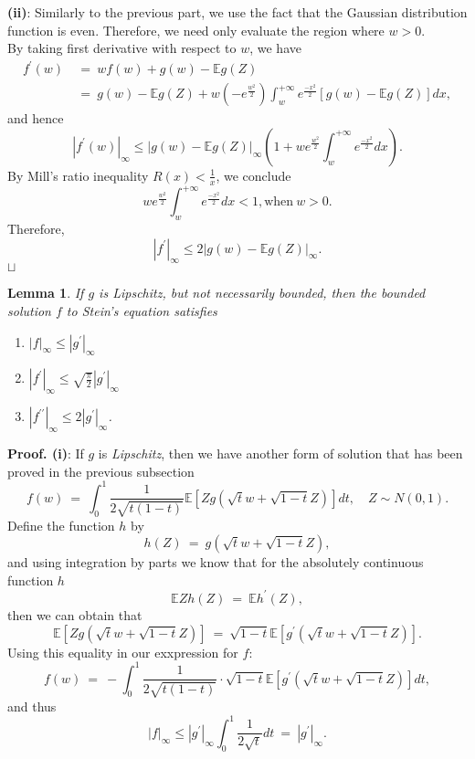 \documentclass[12pt]{article}
\newcommand\qed{\hfill\hbox{\rlap{$\sqcap$}$\sqcup$}}
\newcommand{\eq }{\: = \:}
\newtheorem{lemma}{Lemma}
\theoremstyle{nonumberplain}
\begin{document}
\textbf{(ii)}: Similarly to the previous part, we use the fact that the Gaussian distribution function is even. Therefore, we need only evaluate the region where $w>0$.\\
By taking first derivative with respect to $w$, we have
\begin{align*}
f^{\prime}(w)&\eq wf(w)+g(w)-\mathbb{E}g(Z)\\
&\eq g(w)-\mathbb{E}g(Z)+w(-e^{\frac{w^{2}}{2}}) \int_{w}^{+\infty} e^{\frac{-x^{2}}{2}}[g(w)-\mathbb{E}g(Z)]dx,
\end{align*}
and hence
$$
|f^{\prime}(w)|_{\infty}\leq |g(w)-\mathbb{E}g(Z)|_{\infty} (1+we^{\frac{w^{2}}{2}} \int_{w}^{+\infty} e^{\frac{-x^{2}}{2}}dx).
$$
By Mill's ratio inequality $R(x)<\frac{1}{x}$, we conclude
$$
we^{\frac{w^{2}}{2}} \int_{w}^{+\infty} e^{\frac{-x^{2}}{2}}dx < 1, \mbox{when} \ w>0.
$$
Therefore,
$$
|f^{\prime}|_{\infty} \leq 2|g(w)-\mathbb{E}g(Z)|_{\infty}.
$$
\qed

\begin{lemma}
If $g$ is {\it Lipschitz\/}, but not necessarily bounded, then the bounded solution $f$ to Stein's equation satisfies
\begin{enumerate}
    \item [(i)] $|f|_{\infty} \leq |g^{\prime}|_{\infty}$
    \item [(ii)] $|f^{\prime}|_{\infty} \leq \sqrt{\frac{\pi}{2}}|g^{\prime}|_{\infty}$
    \item [(iii)] $|f^{\prime \prime}|_{\infty} \leq 2|g^{\prime}|_{\infty}$.
\end{enumerate}
\end{lemma}
\textbf{Proof. (i)}: If $g$ is {\it Lipschitz\/}, then we have another form of solution that has been proved in the previous subsection
$$
f(w)\eq \int_{0}^{1} \frac{1}{2\sqrt{t(1-t)}} \mathbb{E}[Zg(\sqrt{t}w+\sqrt{1-t}Z)]dt, \quad Z\sim N(0,1).
$$
Define the function $h$ by
$$
h(Z)\eq g(\sqrt{t}w+\sqrt{1-t}Z),
$$
and using integration by parts we know that for the absolutely continuous function $h$
$$
\mathbb{E}Zh(Z)\eq \mathbb{E}h^{\prime}(Z),
$$
then we can obtain that 
\begin{equation}
\mathbb{E}[Zg(\sqrt{t}w+\sqrt{1-t}Z)]\eq \sqrt{1-t} \mathbb{E}[g^{\prime}(\sqrt{t}w+\sqrt{1-t}Z)].
\end{equation}
Using this equality in our exxpression for $f$:
$$
f(w)\eq  -\int_{0}^{1} \frac{1}{2\sqrt{t(1-t)}}\cdot \sqrt{1-t} \mathbb{E}[g^{\prime}(\sqrt{t}w+\sqrt{1-t}Z)]dt,
$$
and thus
$$
|f|_{\infty} \leq |g^{\prime}|_{\infty} \int_{0}^{1} \frac{1}{2\sqrt{t}}dt \eq |g^{\prime}|_{\infty}.
$$
\end{document}
